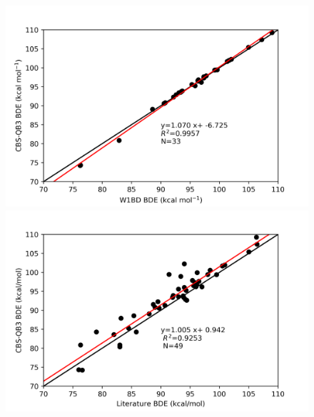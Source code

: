 \begin{figure}
\hspace*{-1.5cm}
\begin{minipage}{8cm}
  \centering
  \includegraphics[width=\textwidth]{figures/w1bd-cbsqb3}
\end{minipage}%
\begin{minipage}{8cm}
  \centering
  \includegraphics[width=\textwidth]{figures/lit-cbsqb3}
\end{minipage}
\end{figure}

